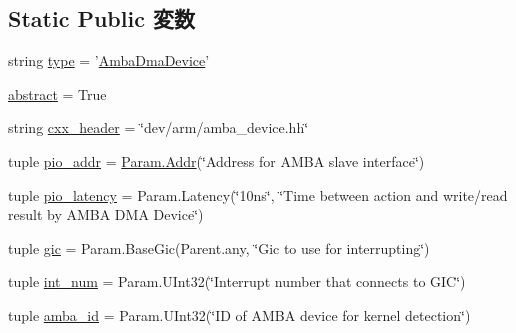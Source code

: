 \subsection*{Static Public 変数}
\begin{DoxyCompactItemize}
\item 
string \hyperlink{classRealView_1_1AmbaDmaDevice_acce15679d830831b0bbe8ebc2a60b2ca}{type} = '\hyperlink{classRealView_1_1AmbaDmaDevice}{AmbaDmaDevice}'
\item 
\hyperlink{classRealView_1_1AmbaDmaDevice_a17fa61ac3806b481cafee5593b55e5d0}{abstract} = True
\item 
string \hyperlink{classRealView_1_1AmbaDmaDevice_a17da7064bc5c518791f0c891eff05fda}{cxx\_\-header} = \char`\"{}dev/arm/amba\_\-device.hh\char`\"{}
\item 
tuple \hyperlink{classRealView_1_1AmbaDmaDevice_aac8239d62c5a04a05fcc71d4ac63fdb4}{pio\_\-addr} = \hyperlink{base_2types_8hh_af1bb03d6a4ee096394a6749f0a169232}{Param.Addr}(\char`\"{}Address for AMBA slave interface\char`\"{})
\item 
tuple \hyperlink{classRealView_1_1AmbaDmaDevice_ac3f272675842a6662ce8782e10fdba39}{pio\_\-latency} = Param.Latency(\char`\"{}10ns\char`\"{}, \char`\"{}Time between action and write/read result by AMBA DMA Device\char`\"{})
\item 
tuple \hyperlink{classRealView_1_1AmbaDmaDevice_a40243beb62d217c3a9e35801ae739fd0}{gic} = Param.BaseGic(Parent.any, \char`\"{}Gic to use for interrupting\char`\"{})
\item 
tuple \hyperlink{classRealView_1_1AmbaDmaDevice_a65fded6db751c1b9aa7168b29056e819}{int\_\-num} = Param.UInt32(\char`\"{}Interrupt number that connects to GIC\char`\"{})
\item 
tuple \hyperlink{classRealView_1_1AmbaDmaDevice_ad9d2b9e37de5c1c7c10219fc1b834599}{amba\_\-id} = Param.UInt32(\char`\"{}ID of AMBA device for kernel detection\char`\"{})
\end{DoxyCompactItemize}


